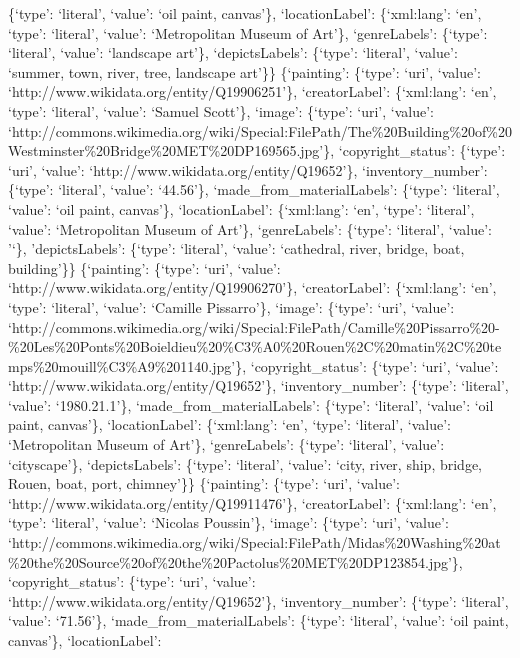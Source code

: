 \documentclass[
  letterpaper,
  DIV=11,
  numbers=noendperiod]{scrreprt}
\begin{document}
\{`type': `literal', `value': `oil paint, canvas'\}, `locationLabel':
\{`xml:lang': `en', `type': `literal', `value': `Metropolitan Museum of
Art'\}, `genreLabels': \{`type': `literal', `value': `landscape art'\},
`depictsLabels': \{`type': `literal', `value': `summer, town, river,
tree, landscape art'\}\} \{`painting': \{`type': `uri', `value':
`http://www.wikidata.org/entity/Q19906251'\}, `creatorLabel':
\{`xml:lang': `en', `type': `literal', `value': `Samuel Scott'\},
`image': \{`type': `uri', `value':
`http://commons.wikimedia.org/wiki/Special:FilePath/The\%20Building\%20of\%20Westminster\%20Bridge\%20MET\%20DP169565.jpg'\},
`copyright\_status': \{`type': `uri', `value':
`http://www.wikidata.org/entity/Q19652'\}, `inventory\_number':
\{`type': `literal', `value': `44.56'\}, `made\_from\_materialLabels':
\{`type': `literal', `value': `oil paint, canvas'\}, `locationLabel':
\{`xml:lang': `en', `type': `literal', `value': `Metropolitan Museum of
Art'\}, `genreLabels': \{`type': `literal', `value': '`\},
'depictsLabels': \{`type': `literal', `value': `cathedral, river,
bridge, boat, building'\}\} \{`painting': \{`type': `uri', `value':
`http://www.wikidata.org/entity/Q19906270'\}, `creatorLabel':
\{`xml:lang': `en', `type': `literal', `value': `Camille Pissarro'\},
`image': \{`type': `uri', `value':
`http://commons.wikimedia.org/wiki/Special:FilePath/Camille\%20Pissarro\%20-\%20Les\%20Ponts\%20Boieldieu\%20\%C3\%A0\%20Rouen\%2C\%20matin\%2C\%20temps\%20mouill\%C3\%A9\%201140.jpg'\},
`copyright\_status': \{`type': `uri', `value':
`http://www.wikidata.org/entity/Q19652'\}, `inventory\_number':
\{`type': `literal', `value': `1980.21.1'\},
`made\_from\_materialLabels': \{`type': `literal', `value': `oil paint,
canvas'\}, `locationLabel': \{`xml:lang': `en', `type': `literal',
`value': `Metropolitan Museum of Art'\}, `genreLabels': \{`type':
`literal', `value': `cityscape'\}, `depictsLabels': \{`type': `literal',
`value': `city, river, ship, bridge, Rouen, boat, port, chimney'\}\}
\{`painting': \{`type': `uri', `value':
`http://www.wikidata.org/entity/Q19911476'\}, `creatorLabel':
\{`xml:lang': `en', `type': `literal', `value': `Nicolas Poussin'\},
`image': \{`type': `uri', `value':
`http://commons.wikimedia.org/wiki/Special:FilePath/Midas\%20Washing\%20at\%20the\%20Source\%20of\%20the\%20Pactolus\%20MET\%20DP123854.jpg'\},
`copyright\_status': \{`type': `uri', `value':
`http://www.wikidata.org/entity/Q19652'\}, `inventory\_number':
\{`type': `literal', `value': `71.56'\}, `made\_from\_materialLabels':
\{`type': `literal', `value': `oil paint, canvas'\}, `locationLabel':
\end{document}
